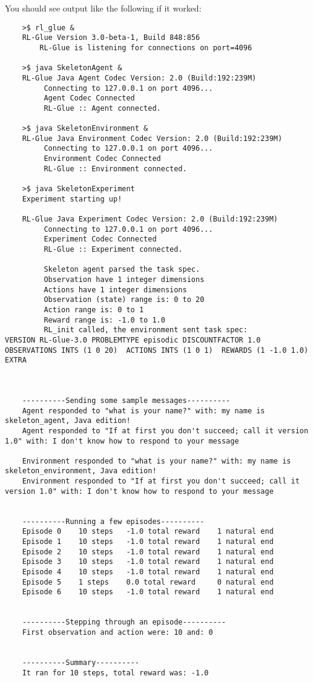 \documentclass[11pt]{article}
\begin{document}
You should see output like the following if it worked:
\begin{verbatim}
	>$ rl_glue & 
	RL-Glue Version 3.0-beta-1, Build 848:856
     	RL-Glue is listening for connections on port=4096

	>$ java SkeletonAgent &
	RL-Glue Java Agent Codec Version: 2.0 (Build:192:239M)
	     Connecting to 127.0.0.1 on port 4096...
	     Agent Codec Connected
	     RL-Glue :: Agent connected.
	
	>$ java SkeletonEnvironment &
	RL-Glue Java Environment Codec Version: 2.0 (Build:192:239M)
	     Connecting to 127.0.0.1 on port 4096...
	     Environment Codec Connected
	     RL-Glue :: Environment connected.

	>$ java SkeletonExperiment
	Experiment starting up!

	RL-Glue Java Experiment Codec Version: 2.0 (Build:192:239M)
	     Connecting to 127.0.0.1 on port 4096...
	     Experiment Codec Connected
	     RL-Glue :: Experiment connected.

	     Skeleton agent parsed the task spec.
	     Observation have 1 integer dimensions
	     Actions have 1 integer dimensions
	     Observation (state) range is: 0 to 20
	     Action range is: 0 to 1
	     Reward range is: -1.0 to 1.0
	     RL_init called, the environment sent task spec:
VERSION RL-Glue-3.0 PROBLEMTYPE episodic DISCOUNTFACTOR 1.0 
OBSERVATIONS INTS (1 0 20)  ACTIONS INTS (1 0 1)  REWARDS (1 -1.0 1.0)  EXTRA 



	----------Sending some sample messages----------
	Agent responded to "what is your name?" with: my name is skeleton_agent, Java edition!
	Agent responded to "If at first you don't succeed; call it version 1.0" with: I don't know how to respond to your message

	Environment responded to "what is your name?" with: my name is skeleton_environment, Java edition!
	Environment responded to "If at first you don't succeed; call it version 1.0" with: I don't know how to respond to your message


	----------Running a few episodes----------
	Episode 0	 10 steps 	-1.0 total reward	 1 natural end
	Episode 1	 10 steps 	-1.0 total reward	 1 natural end
	Episode 2	 10 steps 	-1.0 total reward	 1 natural end
	Episode 3	 10 steps 	-1.0 total reward	 1 natural end
	Episode 4	 10 steps 	-1.0 total reward	 1 natural end
	Episode 5	 1 steps 	0.0 total reward	 0 natural end
	Episode 6	 10 steps 	-1.0 total reward	 1 natural end


	----------Stepping through an episode----------
	First observation and action were: 10 and: 0


	----------Summary----------
	It ran for 10 steps, total reward was: -1.0

\end{verbatim}
\end{document}
